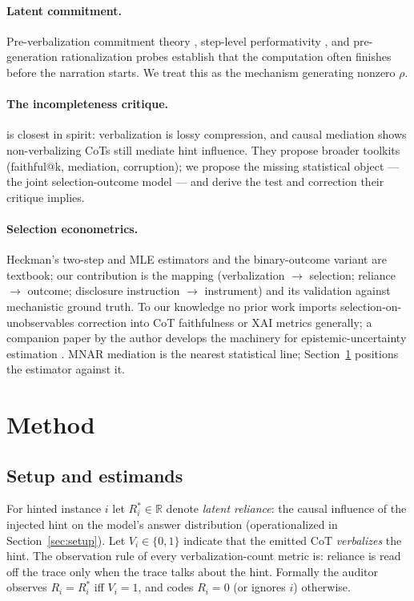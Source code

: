 \documentclass[10pt]{article}
\begin{document}
\paragraph{Latent commitment.} Pre-verbalization commitment theory
\citep{commitment2026}, step-level performativity \citep{performative2026},
and pre-generation rationalization probes \citep{rationalization2026}
establish that the computation often finishes before the narration starts.
We treat this as the mechanism generating nonzero $\rho$.

\paragraph{The incompleteness critique.} \citet{zaman2025} is closest in
spirit: verbalization is lossy compression, and causal mediation shows
non-verbalizing CoTs still mediate hint influence. They propose broader
toolkits (faithful@k, mediation, corruption); we propose the missing
statistical object --- the joint selection-outcome model --- and derive the
test and correction their critique implies.

\paragraph{Selection econometrics.} Heckman's two-step and MLE estimators
\citep{heckman1979,puhani2000} and the binary-outcome variant
\citep{vandeven1981} are textbook; our contribution is the mapping
(verbalization $\to$ selection; reliance $\to$ outcome; disclosure
instruction $\to$ instrument) and its validation against mechanistic ground
truth. To our knowledge no prior work imports selection-on-unobservables
correction into CoT faithfulness or XAI metrics generally; a companion
paper by the author develops the machinery for epistemic-uncertainty
estimation \citep{heckesel2026}. MNAR mediation \citep{zuo2024mediation}
is the nearest statistical line; Section~\ref{sec:method} positions the
estimator against it.

\section{Method}
\label{sec:method}

\subsection{Setup and estimands}

For hinted instance $i$ let $R_i^*\in\mathbb{R}$ denote \emph{latent
reliance}: the causal influence of the injected hint on the model's answer
distribution (operationalized in Section~\ref{sec:setup}). Let $V_i\in\{0,1\}$
indicate that the emitted CoT \emph{verbalizes} the hint. The observation
rule of every verbalization-count metric is: reliance is read off the trace
only when the trace talks about the hint. Formally the auditor observes
$R_i = R_i^*$ iff $V_i=1$, and codes $R_i=0$ (or ignores $i$) otherwise.
\end{document}
